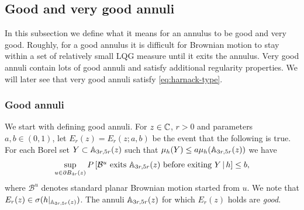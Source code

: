 \documentclass[12pt]{amsart}
\numberwithin{equation}{section}
\begin{document}
	
	
	\subsection{Good and very good annuli} \label{subsec:good-and-very-good-annuli}
	
	In this subsection we define what it means for an annulus to be good and very good.  
	Roughly, for a good annulus it is difficult for Brownian motion to stay within a set 
	of relatively small LQG measure until it exits the annulus. Very good annuli
	contain lots of good annuli and satisfy additional regularity properties. 
	We will later see that very good annuli satisfy \eqref{eq:harnack-type}.  
	
	\subsubsection{Good annuli}
	We start with defining good annuli. For $z \in \mathbb{C}$, $r > 0$ and parameters $a,b \in (0,1)$,
	let $E_r(z) = E_r(z; a,b)$ be the event that the following is true. For each Borel set $Y \subset \mathbb{A}_{3r, 5r}(z)$
	such that $\mu_h(Y) \leq a \mu_h(\mathbb{A}_{3 r, 5r}(z))$ we have 
	\begin{equation} \label{eq:good-annulus-harmonic}
	\sup_{u \in \partial B_{4 r}(z)} P\left[ \mbox{$\mathcal{B}^u$ exits $\mathbb{A}_{3 r, 5 r}(z)$ before exiting $Y$}  \, |\, h  \right] \leq b ,
	\end{equation}
	where $\mathcal B^u$ denotes standard planar Brownian motion started from $u$. 
	We note that $E_r(z) \in \sigma(h |_{\mathbb{A}_{3r,5r}(z)})$.
	The annuli $\mathbb{A}_{3 r, 5r}(z)$ for which $E_r(z)$ holds are {\it good}.
	
\end{document}
